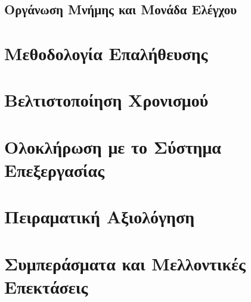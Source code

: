 \subsection{Οργάνωση Μνήμης και Μονάδα Ελέγχου}

\section{Μεθοδολογία Επαλήθευσης}

\section{Βελτιστοποίηση Χρονισμού}

\section{Ολοκλήρωση με το Σύστημα Επεξεργασίας}

\section{Πειραματική Αξιολόγηση}

\section{Συμπεράσματα και Μελλοντικές Επεκτάσεις}

